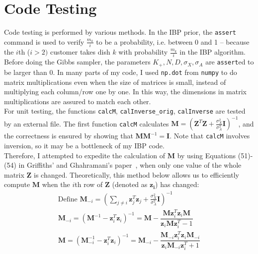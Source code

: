\section{Code Testing}
Code testing is performed by various methods. In the IBP prior, the \texttt{assert} command is used to verify $\frac{m_k}{i}$ to be a probability, i.e. between 0 and 1 -- because the $i$th ($i > 2)$ customer takes dish $k$ with probability $\frac{m_k}{i}$ in the IBP algorithm. Before doing the Gibbs sampler, the parameters $K_+, N, D, \sigma_X, \sigma_A$ are \texttt{assert}ed to be larger than 0. In many parts of my code, I used \texttt{np.dot} from \texttt{numpy} to do matrix multiplications even when the size of matrices is small, instead of multiplying each column/row one by one. In this way, the dimensions in matrix multiplications are assured to match each other.\\

For unit testing, the functions \texttt{calcM}, \texttt{calInverse\_orig}, \texttt{calInverse} are tested by an external file. The first function \texttt{calcM} calculates $\mathbf{M} = (\mathbf{Z}^T\mathbf{Z}+\frac{\sigma_X^2}{\sigma_A^2}\mathbf{I})^{-1}$, and the correctness is ensured by showing that $\mathbf{M}\mathbf{M}^{-1} = \mathbf{I}$. Note that \texttt{calcM} involves inversion, so it may be a bottleneck of my IBP code.\\

Therefore, I attempted to expedite the calculation of $\mathbf{M}$ by using Equations (51)-(54) in Griffiths' and Ghahramani's paper~\cite{griffiths2005detailed}, when only one value of the whole matrix $\textbf{Z}$ is changed. Theoretically, this method below allows us to efficiently compute $\mathbf{M}$ when the $i$th row of $\mathbf{Z}$ (denoted as $\mathbf{z_i}$) has changed:
\begin{gather}
\text{Define } \mathbf{M}_{-i} = (\sum_{j \neq i}\mathbf{z}^T_j \mathbf{z}_j + \frac{\sigma_X^2}{\sigma_A^2}\mathbf{I})^{-1} \\
\mathbf{M}_{-i} = (\mathbf{M}^{-1} - \mathbf{z}^T_i \mathbf{z}_i)^{-1} 
= \mathbf{M} - \dfrac{\mathbf{M}\mathbf{z}^T_i \mathbf{z}_i\mathbf{M}}{\mathbf{z}_i\mathbf{M}\mathbf{z}^T_i - 1} \\
\mathbf{M} = (\mathbf{M}_{-i}^{-1} - \mathbf{z}^T_i \mathbf{z}_i)^{-1} 
= \mathbf{M}_{-i} - \dfrac{\mathbf{M}_{-i}\mathbf{z}^T_i \mathbf{z}_i\mathbf{M}_{-i}}{\mathbf{z}_i\mathbf{M}_{-i}\mathbf{z}^T_i + 1}
\end{gather}

